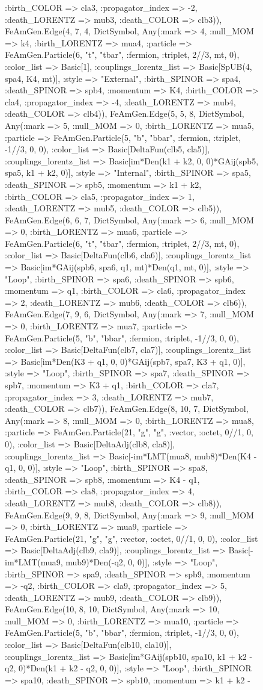 \documentclass{revtex4}
\begin{document}
\begin{figure}[!htb]
\begin{center}
{:birth_COLOR => cla3, :propagator_index => -2, :death_LORENTZ => mub3, :death_COLOR => clb3)), FeAmGen.Edge(4, 7, 4, Dict{Symbol, Any}(:mark => 4, :null_MOM => k4, :birth_LORENTZ => mua4, :particle => FeAmGen.Particle(6, "t", "tbar", :fermion, :triplet, 2//3, mt, 0), :color_list => Basic[1], :couplings_lorentz_list => Basic[SpUB(4, spa4, K4, mt)], :style => "External", :birth_SPINOR => spa4, :death_SPINOR => spb4, :momentum => K4, :birth_COLOR => cla4, :propagator_index => -4, :death_LORENTZ => mub4, :death_COLOR => clb4)), FeAmGen.Edge(5, 5, 8, Dict{Symbol, Any}(:mark => 5, :null_MOM => 0, :birth_LORENTZ => mua5, :particle => FeAmGen.Particle(5, "b", "bbar", :fermion, :triplet, -1//3, 0, 0), :color_list => Basic[DeltaFun(clb5, cla5)], :couplings_lorentz_list => Basic[im*Den(k1 + k2, 0, 0)*GAij(spb5, spa5, k1 + k2, 0)], :style => "Internal", :birth_SPINOR => spa5, :death_SPINOR => spb5, :momentum => k1 + k2, :birth_COLOR => cla5, :propagator_index => 1, :death_LORENTZ => mub5, :death_COLOR => clb5)), FeAmGen.Edge(6, 6, 7, Dict{Symbol, Any}(:mark => 6, :null_MOM => 0, :birth_LORENTZ => mua6, :particle => FeAmGen.Particle(6, "t", "tbar", :fermion, :triplet, 2//3, mt, 0), :color_list => Basic[DeltaFun(clb6, cla6)], :couplings_lorentz_list => Basic[im*GAij(spb6, spa6, q1, mt)*Den(q1, mt, 0)], :style => "Loop", :birth_SPINOR => spa6, :death_SPINOR => spb6, :momentum => q1, :birth_COLOR => cla6, :propagator_index => 2, :death_LORENTZ => mub6, :death_COLOR => clb6)), FeAmGen.Edge(7, 9, 6, Dict{Symbol, Any}(:mark => 7, :null_MOM => 0, :birth_LORENTZ => mua7, :particle => FeAmGen.Particle(5, "b", "bbar", :fermion, :triplet, -1//3, 0, 0), :color_list => Basic[DeltaFun(clb7, cla7)], :couplings_lorentz_list => Basic[im*Den(K3 + q1, 0, 0)*GAij(spb7, spa7, K3 + q1, 0)], :style => "Loop", :birth_SPINOR => spa7, :death_SPINOR => spb7, :momentum => K3 + q1, :birth_COLOR => cla7, :propagator_index => 3, :death_LORENTZ => mub7, :death_COLOR => clb7)), FeAmGen.Edge(8, 10, 7, Dict{Symbol, Any}(:mark => 8, :null_MOM => 0, :birth_LORENTZ => mua8, :particle => FeAmGen.Particle(21, "g", "g", :vector, :octet, 0//1, 0, 0), :color_list => Basic[DeltaAdj(clb8, cla8)], :couplings_lorentz_list => Basic[-im*LMT(mua8, mub8)*Den(K4 - q1, 0, 0)], :style => "Loop", :birth_SPINOR => spa8, :death_SPINOR => spb8, :momentum => K4 - q1, :birth_COLOR => cla8, :propagator_index => 4, :death_LORENTZ => mub8, :death_COLOR => clb8)), FeAmGen.Edge(9, 9, 8, Dict{Symbol, Any}(:mark => 9, :null_MOM => 0, :birth_LORENTZ => mua9, :particle => FeAmGen.Particle(21, "g", "g", :vector, :octet, 0//1, 0, 0), :color_list => Basic[DeltaAdj(clb9, cla9)], :couplings_lorentz_list => Basic[-im*LMT(mua9, mub9)*Den(-q2, 0, 0)], :style => "Loop", :birth_SPINOR => spa9, :death_SPINOR => spb9, :momentum => -q2, :birth_COLOR => cla9, :propagator_index => 5, :death_LORENTZ => mub9, :death_COLOR => clb9)), FeAmGen.Edge(10, 8, 10, Dict{Symbol, Any}(:mark => 10, :null_MOM => 0, :birth_LORENTZ => mua10, :particle => FeAmGen.Particle(5, "b", "bbar", :fermion, :triplet, -1//3, 0, 0), :color_list => Basic[DeltaFun(clb10, cla10)], :couplings_lorentz_list => Basic[im*GAij(spb10, spa10, k1 + k2 - q2, 0)*Den(k1 + k2 - q2, 0, 0)], :style => "Loop", :birth_SPINOR => spa10, :death_SPINOR => spb10, :momentum => k1 + k2 - }
\end{center}
\end{figure}
\end{document}
